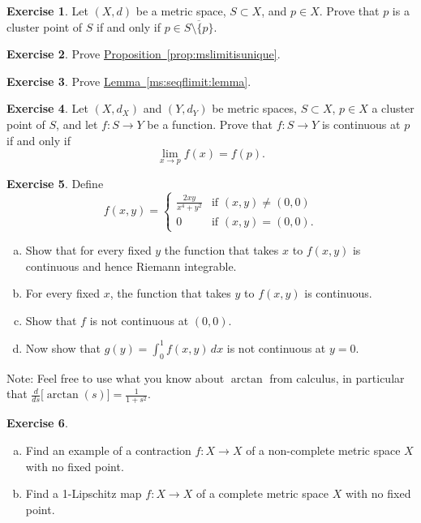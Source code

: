 \documentclass[12pt,openany]{book}
\theoremstyle{plain}
\theoremstyle{remark}
\theoremstyle{definition}
\newenvironment{exbox}{%
    \def\FrameCommand{\vrule width 1pt \relax\hspace {10pt}}%
    \MakeFramed {\advance \hsize -\width \FrameRestore }%
}{%
    \endMakeFramed
}
\newenvironment{exparts}{%
    \leavevmode\begin{enumerate}[a),noitemsep,topsep=0pt,parsep=0pt,partopsep=0pt]
}{%
    \end{enumerate}
}
\theoremstyle{exercise}
\newtheorem{exercise}{Exercise}[section]
\theoremstyle{example}
\newcommand{\propref}[1]{\hyperref[#1]{Proposition~\ref*{#1}}}
\newcommand{\lemmaref}[1]{\hyperref[#1]{Lemma~\ref*{#1}}}
\begin{document}
\begin{exbox}
\begin{exercise}
Let $(X,d)$ be a metric space, $S \subset X$, and $p \in X$.  Prove that
$p$ is a cluster point of $S$ if and only if $p \in \overline{S \setminus \{
p \}}$.
\end{exercise}

\begin{exercise}
Prove \propref{prop:mslimitisunique}.
\end{exercise}

\begin{exercise}
Prove \lemmaref{ms:seqflimit:lemma}.
\end{exercise}

\begin{exercise}
Let $(X,d_X)$ and $(Y,d_Y)$ be metric spaces, $S \subset X$, $p \in X$
a cluster point of $S$, and let $f \colon S \to Y$ be a function.
Prove that
$f \colon S \to Y$ is continuous at $p$ if and only if
\begin{equation*}
\lim_{x \to p} f(x) = f(p) .
\end{equation*}
\end{exercise}

\begin{exercise}
Define
\begin{equation*}
f(x,y) =
\begin{cases}
\frac{2xy}{x^4+y^2} & \text{if } (x,y) \not= (0,0) \\
0 & \text{if } (x,y) = (0,0) .
\end{cases}
\end{equation*}
\begin{exparts}
\item
Show that for every fixed $y$ the function that takes $x$ to $f(x,y)$
is continuous and hence Riemann integrable.
\item
For every fixed $x$, the function that takes $y$ to $f(x,y)$ is continuous.
\item
Show that $f$ is not continuous at $(0,0)$.
\item
Now show that $g(y) = \int_0^1 f(x,y)\,dx$ is not continuous at $y=0$.
\end{exparts}
Note: Feel free to use what you know about $\arctan$ from calculus,
in particular that $\frac{d}{ds} \bigl[ \arctan(s) \bigr] = \frac{1}{1+s^2}$.
\end{exercise}

\begin{exercise} \label{exercise:nofixedpoint}
\begin{exparts}
\item
Find an example of a contraction $f \colon X \to X$
of a non-complete metric space $X$ with no
fixed point.
\item
Find a 1-Lipschitz map $f \colon X \to X$ of a complete metric space $X$ with no fixed point.
\end{exparts}
\end{exercise}
\end{exbox}
\end{document}
